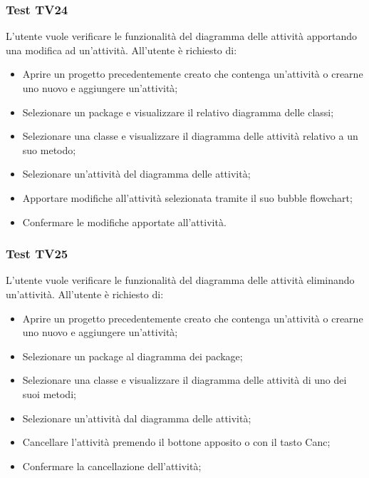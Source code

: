 \documentclass[../PianoDiQualifica.tex]{subfiles}
\begin{document}
	\subsubsection{Test TV24} 
	L'utente vuole verificare le funzionalità del diagramma delle attività apportando una modifica ad un'attività. 
	All'utente è richiesto di: 
	\begin{itemize}  
		\item Aprire un progetto precedentemente creato che contenga un'attività o crearne uno nuovo e aggiungere un'attività;
		\item Selezionare un package e visualizzare il relativo diagramma delle classi; 
		\item Selezionare una classe e visualizzare il diagramma delle attività relativo a un suo metodo; 
		\item Selezionare un'attività del diagramma delle attività; 
		\item Apportare modifiche all'attività selezionata tramite il suo bubble flowchart; %
		\item Confermare le modifiche apportate all'attività. 
	\end{itemize} 
	
	
	\subsubsection{Test TV25} 
	L'utente vuole verificare le funzionalità del diagramma delle attività eliminando un'attività. 
	All'utente è richiesto di: 
	\begin{itemize} 
		\item Aprire un progetto precedentemente creato che contenga un'attività o crearne uno nuovo e aggiungere un'attività;
		\item Selezionare un package al diagramma dei package; 
		\item Selezionare una classe e visualizzare il diagramma delle attività di uno dei suoi metodi; 
		\item Selezionare un'attività dal diagramma delle attività; 
		\item Cancellare l'attività premendo il bottone apposito o con il tasto Canc; 
		\item Confermare la cancellazione dell'attività; 
	\end{itemize} 
	
\end{document}
